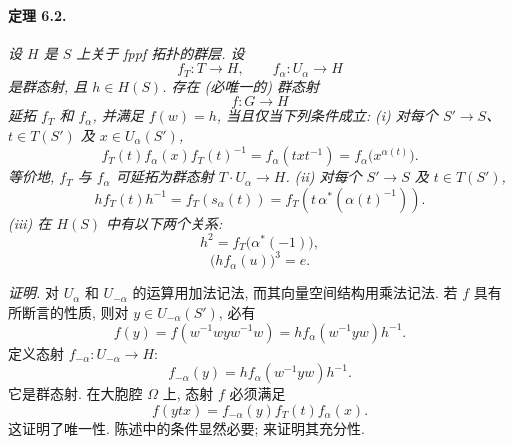 \paragraph{\textbf{定理 6.2.}}
\emph{设 \(H\) 是 \(S\) 上关于 fppf 拓扑的群层. 设}
\[
 f_T\colon T\longrightarrow H,
 \qquad
 f_\alpha\colon U_\alpha\longrightarrow H
\]
\emph{是群态射, 且 \(h\in H(S)\). 存在 \textup{(必唯一的)} 群态射}
\[
 f\colon G\longrightarrow H
\]
\emph{延拓 \(f_T\) 和 \(f_\alpha\), 并满足 \(f(w)=h\), 当且仅当下列条件成立:}
\emph{\textup{(i)} 对每个 \(S'\to S\)、\(t\in T(S')\) 及 \(x\in U_\alpha(S')\),}
\begin{equation}
\tag{1}\label{sga3:xx:theorem:6-2:equation:1}
 f_T(t)f_\alpha(x)f_T(t)^{-1}
 =f_\alpha(txt^{-1})
 =f_\alpha\bigl(x^{\alpha(t)}\bigr).
\end{equation}
\emph{等价地, \(f_T\) 与 \(f_\alpha\) 可延拓为群态射 \(T\cdot U_\alpha\to H\).}
\emph{\textup{(ii)} 对每个 \(S'\to S\) 及 \(t\in T(S')\),}
\begin{equation}
\tag{2}\label{sga3:xx:theorem:6-2:equation:2}
 h f_T(t)h^{-1}
 =f_T(s_\alpha(t))
 =f_T\!\left(t\,\alpha^\ast(\alpha(t)^{-1})\right).
\end{equation}
\emph{\textup{(iii)} 在 \(H(S)\) 中有以下两个关系:}
\begin{equation}
\tag{3}\label{sga3:xx:theorem:6-2:equation:3}
 h^2=f_T\bigl(\alpha^\ast(-1)\bigr),
\end{equation}
\begin{equation}
\tag{4}\label{sga3:xx:theorem:6-2:equation:4}
 \bigl(hf_\alpha(u)\bigr)^3=e.
\end{equation}

\smallskip
\noindent\emph{证明.}
对 \(U_\alpha\) 和 \(U_{-\alpha}\) 的运算用加法记法, 而其向量空间结构用乘法记法. 若 \(f\) 具有所断言的性质, 则对 \(y\in U_{-\alpha}(S')\), 必有
\[
 f(y)
 =f(w^{-1}wyw^{-1}w)
 =h f_\alpha(w^{-1}yw)h^{-1}.
\]
定义态射 \(f_{-\alpha}\colon U_{-\alpha}\to H\):
\begin{equation}
\tag{\(\ast_1\)}\label{sga3:xx:theorem:6-2:equation:ast-1}
 f_{-\alpha}(y)=h f_\alpha(w^{-1}yw)h^{-1}.
\end{equation}
它是群态射. 在大胞腔 \(\Omega\) 上, 态射 \(f\) 必须满足
\[
 f(ytx)=f_{-\alpha}(y)f_T(t)f_\alpha(x).
\]
这证明了唯一性. 陈述中的条件显然必要; 来证明其充分性.


